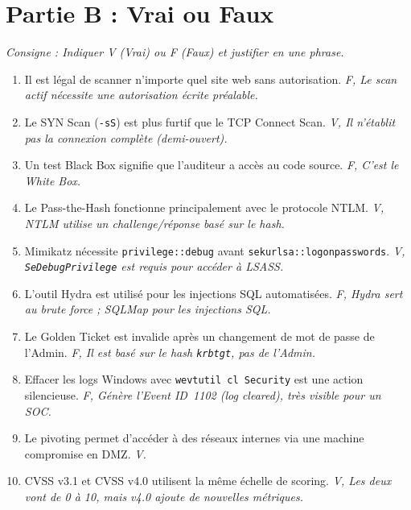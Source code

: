 \section{Partie B : Vrai ou Faux}
\label{sec:vrai_faux}

\textit{Consigne : Indiquer V (Vrai) ou F (Faux) et justifier en une phrase.}

\begin{enumerate}
    \item Il est légal de scanner n'importe quel site web sans autorisation.
          \hfill\textit{F, Le scan actif nécessite une autorisation écrite préalable.}
    \item Le SYN Scan (\texttt{-sS}) est plus furtif que le TCP Connect Scan.
          \hfill\textit{V, Il n'établit pas la connexion complète (demi-ouvert).}
    \item Un test \og{}Black Box\fg{} signifie que l'auditeur a accès au code source.
          \hfill\textit{F, C'est le \og{}White Box\fg{}.}
    \item Le Pass-the-Hash fonctionne principalement avec le protocole NTLM.
          \hfill\textit{V, NTLM utilise un challenge/réponse basé sur le hash.}
    \item Mimikatz nécessite \texttt{privilege::debug} avant \texttt{sekurlsa::logonpasswords}.
          \hfill\textit{V, \texttt{SeDebugPrivilege} est requis pour accéder à LSASS.}
    \item L'outil Hydra est utilisé pour les injections SQL automatisées.
          \hfill\textit{F, Hydra sert au brute force ; SQLMap pour les injections SQL.}
    \item Le Golden Ticket est invalide après un changement de mot de passe de l'Admin.
          \hfill\textit{F, Il est basé sur le hash \texttt{krbtgt}, pas de l'Admin.}
    \item Effacer les logs Windows avec \texttt{wevtutil cl Security} est une action silencieuse.
          \hfill\textit{F, Génère l'Event ID~1102 (log cleared), très visible pour un SOC.}
    \item Le pivoting permet d'accéder à des réseaux internes via une machine compromise en DMZ.
          \hfill\textit{V.}
    \item CVSS v3.1 et CVSS v4.0 utilisent la même échelle de scoring.
          \hfill\textit{V, Les deux vont de 0 à 10, mais v4.0 ajoute de nouvelles métriques.}
\end{enumerate}

